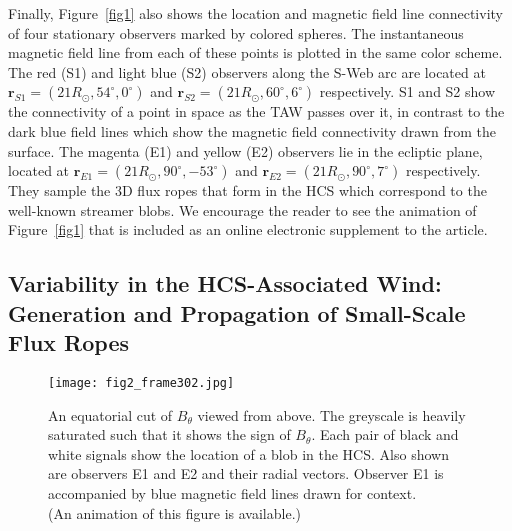 \documentclass[preprint]{aastex62}
\begin{document}
Finally, Figure~\ref{fig1} also shows the location and magnetic
field line connectivity of four stationary observers marked by colored spheres.
The instantaneous magnetic field line from each of these points is
plotted in the same color scheme. The red (S1) and light blue (S2)
observers along the S-Web arc are located at
$\boldsymbol{r}_{S1}=(21R_\odot, 54^\circ, 0^\circ)$ and
$\boldsymbol{r}_{S2}=(21R_\odot, 60^\circ, 6^\circ)$ respectively.
S1 and S2 show the connectivity of a point in space as the TAW
passes over it, in contrast to the dark blue field lines which show
the magnetic field connectivity drawn from the surface. The magenta
(E1) and yellow (E2) observers lie in the ecliptic plane, located
at $\boldsymbol{r}_{E1}=(21R_\odot, 90^\circ, -53^\circ)$ and
$\boldsymbol{r}_{E2}=(21R_\odot, 90^\circ, 7^\circ)$ respectively.
They sample the 3D flux ropes that form in the HCS which correspond
to the well-known streamer blobs. We encourage the reader to see
the animation of Figure~\ref{fig1} that is included as an online
electronic supplement to the article.



\subsection{Variability in the HCS-Associated Wind: Generation and Propagation of Small-Scale Flux Ropes}
\label{ssxn_mhdrxn}


\begin{figure*}
	\texttt{[image: fig2\_frame302.jpg]}
	\caption{An equatorial cut of $B_\theta$ viewed from above.
	The greyscale is heavily saturated such that it shows the
	sign of $B_\theta$. Each pair of black and white signals
	show the location of a blob in the HCS. Also shown are
	observers E1 and E2 and their radial vectors. Observer E1
	is accompanied by blue magnetic field lines drawn for
	context. \\ (An animation of this figure is available.)\\ }
	\label{fig2}
\end{figure*}
\end{document}
